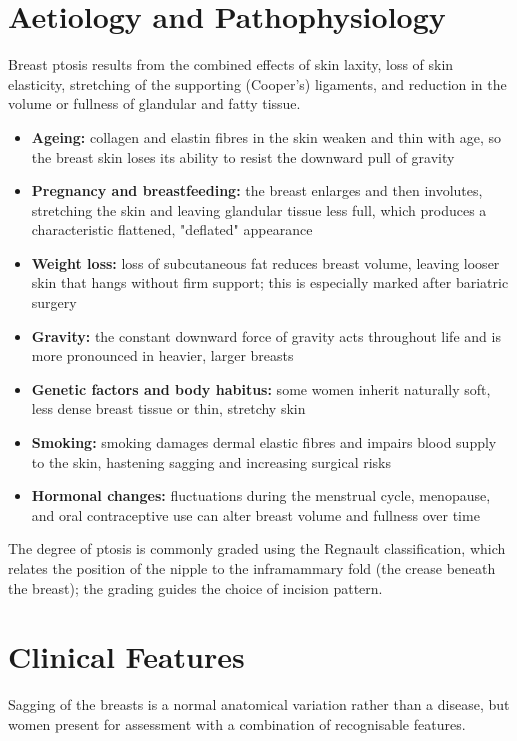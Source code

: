 \section*{Aetiology and Pathophysiology}
Breast ptosis results from the combined effects of skin laxity, loss of skin elasticity, stretching of the supporting (Cooper's) ligaments, and reduction in the volume or fullness of glandular and fatty tissue.

\begin{itemize}
    \item \textbf{Ageing:} collagen and elastin fibres in the skin weaken and thin with age, so the breast skin loses its ability to resist the downward pull of gravity
    \item \textbf{Pregnancy and breastfeeding:} the breast enlarges and then involutes, stretching the skin and leaving glandular tissue less full, which produces a characteristic flattened, "deflated" appearance
    \item \textbf{Weight loss:} loss of subcutaneous fat reduces breast volume, leaving looser skin that hangs without firm support; this is especially marked after bariatric surgery
    \item \textbf{Gravity:} the constant downward force of gravity acts throughout life and is more pronounced in heavier, larger breasts
    \item \textbf{Genetic factors and body habitus:} some women inherit naturally soft, less dense breast tissue or thin, stretchy skin
    \item \textbf{Smoking:} smoking damages dermal elastic fibres and impairs blood supply to the skin, hastening sagging and increasing surgical risks
    \item \textbf{Hormonal changes:} fluctuations during the menstrual cycle, menopause, and oral contraceptive use can alter breast volume and fullness over time
\end{itemize}

The degree of ptosis is commonly graded using the Regnault classification, which relates the position of the nipple to the inframammary fold (the crease beneath the breast); the grading guides the choice of incision pattern.

\section*{Clinical Features}
Sagging of the breasts is a normal anatomical variation rather than a disease, but women present for assessment with a combination of recognisable features.


